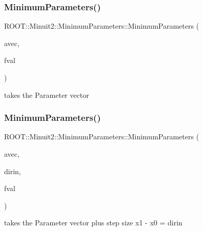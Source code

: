 \subsubsection{\texorpdfstring{MinimumParameters()}{MinimumParameters()}\hspace{0.1cm}{\footnotesize\ttfamily [2/8]}}
{\footnotesize\ttfamily R\+O\+O\+T\+::\+Minuit2\+::\+Minimum\+Parameters\+::\+Minimum\+Parameters (\begin{DoxyParamCaption}\item[{const \mbox{\hyperlink{namespaceROOT_1_1Minuit2_a62ed97730a1ca8d3fbaec64a19aa11c9}{Mn\+Algebraic\+Vector}} \&}]{avec,  }\item[{double}]{fval }\end{DoxyParamCaption})\hspace{0.3cm}{\ttfamily [inline]}}

takes the Parameter vector \mbox{\label{classROOT_1_1Minuit2_1_1MinimumParameters_ad771c737e802f1f6a6f01b94dd249ef7}} 
\subsubsection{\texorpdfstring{MinimumParameters()}{MinimumParameters()}\hspace{0.1cm}{\footnotesize\ttfamily [3/8]}}
{\footnotesize\ttfamily R\+O\+O\+T\+::\+Minuit2\+::\+Minimum\+Parameters\+::\+Minimum\+Parameters (\begin{DoxyParamCaption}\item[{const \mbox{\hyperlink{namespaceROOT_1_1Minuit2_a62ed97730a1ca8d3fbaec64a19aa11c9}{Mn\+Algebraic\+Vector}} \&}]{avec,  }\item[{const \mbox{\hyperlink{namespaceROOT_1_1Minuit2_a62ed97730a1ca8d3fbaec64a19aa11c9}{Mn\+Algebraic\+Vector}} \&}]{dirin,  }\item[{double}]{fval }\end{DoxyParamCaption})\hspace{0.3cm}{\ttfamily [inline]}}

takes the Parameter vector plus step size x1 -\/ x0 = dirin \mbox{\label{classROOT_1_1Minuit2_1_1MinimumParameters_a1e7d7b8ed914bec0a2e4f68642b9a377}} 
